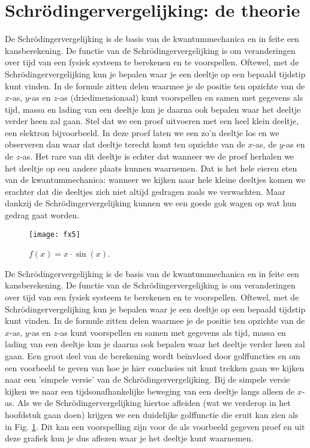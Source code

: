 \documentclass[11pt,fleqn]{book} %
\begin{document}
\section{Schrödingervergelijking: de theorie}
De Schrödingervergelijking is de basis van de kwantummechanica en in feite een kansberekening. De functie van de Schrödingervergelijking is om veranderingen over tijd van een fysiek systeem te berekenen en te voorspellen. Oftewel, met de Schrödingervergelijking kun je bepalen waar je een deeltje op een bepaald tijdstip kunt vinden. In de formule zitten delen waarmee je de positie ten opzichte van de $x$-as, $y$-as en $z$-as (driedimensionaal) kunt voorspellen en samen met gegevens als tijd, massa en lading van een deeltje kun je daarna ook bepalen waar het deeltje verder heen zal gaan.
Stel dat we een proef uitvoeren met een heel klein deeltje, een elektron bijvoorbeeld. In deze proef laten we een zo'n deeltje los en we observeren dan waar dat deeltje terecht komt ten opzichte van de $x$-as, de $y$-as en de $z$-as. Het rare van dit deeltje is echter dat wanneer we de proef herhalen we het deeltje op een andere plaats kunnen waarnemen. Dat is het hele eieren eten van de kwantummechanica: wanneer we kijken naar hele kleine deeltjes komen we erachter dat die deeltjes zich niet altijd gedragen zoals we verwachten. Maar dankzij de Schrödingervergelijking kunnen we een goede gok wagen op wat hun gedrag gaat worden.
\begin{figure}[h]
	\centering\texttt{[image: fx5]}
	\caption{$f(x)=x\cdot\sin{(x)}$.}
	\label{fig:fx5}
\end{figure}
De Schrödingervergelijking is de basis van de kwantummechanica en in feite een kansberekening. De functie van de Schrödingervergelijking is om veranderingen over tijd van een fysiek systeem te berekenen en te voorspellen. Oftewel, met de Schrödingervergelijking kun je bepalen waar je een deeltje op een bepaald tijdstip kunt vinden. In de formule zitten delen waarmee je de positie ten opzichte van de $x$-as, $y$-as en $z$-as kunt voorspellen en samen met gegevens als tijd, massa en lading van een deeltje kun je daarna ook bepalen waar het deeltje verder heen zal gaan.
Een groot deel van de berekening wordt beïnvloed door golffuncties en om een voorbeeld te geven van hoe je hier conclusies uit kunt trekken gaan we kijken naar een 'simpele versie' van de Schrödingervergelijking. Bij de simpele versie kijken we naar een tijdsonafhankelijke beweging van een deeltje langs alleen de $x$-as. Als we de Schrödingervergelijking hiertoe afleiden (wat we verderop in het hoofdstuk gaan doen) krijgen we een duidelijke golffunctie die eruit kan zien als in Fig. \ref{fig:fx5}. Dit kan een voorspelling zijn voor de als voorbeeld gegeven proef en uit deze grafiek kun je dus aflezen waar je het deeltje kunt waarnemen.
\end{document}
